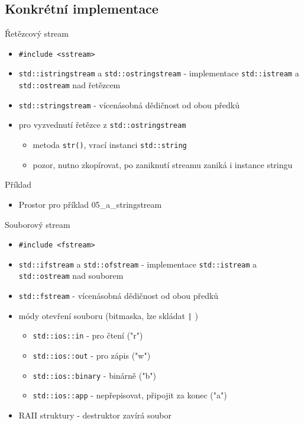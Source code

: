 \documentclass{beamer}
\begin{document}
\subsection{Konkrétní implementace}

\begin{xframe}{Řetězcový stream}
	\begin{itemize}
		\item \texttt{\#include <sstream>}
		\item \texttt{std::istringstream} a \texttt{std::ostringstream} - implementace \texttt{std::istream} a \texttt{std::ostream} nad řetězcem
		\item \texttt{std::stringstream} - vícenásobná dědičnost od obou předků
		\item pro vyzvednutí řetězce z \texttt{std::ostringstream}
			\begin{itemize}
				\item metoda \texttt{str()}, vrací instanci \texttt{std::string}
				\item pozor, nutno zkopírovat, po zaniknutí streamu zaniká i instance stringu
			\end{itemize}
	\end{itemize}
\end{xframe}

\begin{xframe}{Příklad}
	\begin{itemize}
		\item Prostor pro příklad 05\_a\_stringstream
	\end{itemize}
\end{xframe}


\begin{xframe}{Souborový stream}
	\begin{itemize}
		\item \texttt{\#include <fstream>}
		\item \texttt{std::ifstream} a \texttt{std::ofstream} - implementace \texttt{std::istream} a \texttt{std::ostream} nad souborem
		\item \texttt{std::fstream} - vícenásobná dědičnost od obou předků
		\item módy otevření souboru (bitmaska, lze skládat \texttt{|} )
			\begin{itemize}
				\item \texttt{std::ios::in} - pro čtení ("r")
				\item \texttt{std::ios::out} - pro zápis ("w")
				\item \texttt{std::ios::binary} - binárně ("b")
				\item \texttt{std::ios::app} - nepřepisovat, připojit za konec ("a")
			\end{itemize}
		\item RAII struktury - destruktor zavírá soubor
	\end{itemize}
\end{xframe}
\end{document}

